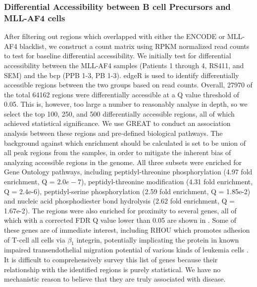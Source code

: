\subsubsection{Differential Accessibility between B cell Precursors and MLL-AF4 cells} \label{ch5:mll_diffacc}

After filtering out regions which overlapped with either the ENCODE or MLL-AF4 blacklist, we construct a count matrix using RPKM normalized read counts to test for baseline differential accessibility. We initially test for differential accessibility between the MLL-AF4 samples (Patients 1 through 4, RS411, and SEM) and the \gls{bcp} (PPB 1-3, PB 1-3). edgeR is used to identify differentially accessible regions between the two groups based on read counts. Overall, 27970 of the total 64162 regions were differentially accessible at a Q value threshold of 0.05. This is, however, too large a number to reasonably analyse in depth, so we select the top 100, 250, and 500 differentially accessible regions, all of which achieved statistical significance. We use GREAT to conduct an association analysis between these regions and pre-defined biological pathways. The background against which enrichment should be calculated is set to be union of all peak regions from the samples, in order to mitigate the inherent bias of analyzing accessible regions in the genome. All three subsets were enriched for Gene Ontology pathways, including peptidyl-threonine phosphorylation (4.97 fold enrichment, Q = $2.0e-7$), peptidyl-threonine modification (4.31 fold enrichment, Q = 2.4e-6), peptidyl-serine phosphorylation (2.59 fold enrichment, Q = 1.85e-2) and nucleic acid phosphodiester bond hydrolysis (2.62 fold enrichment, Q = 1.67e-2). The regions were also enriched for proximity to several genes, all of which with a corrected FDR Q value lower than 0.05 are shown in .  Some of these genes are of immediate interest, including RHOU which promotes adhesion of T-cell \gls{all} cells via $\beta_1$ integrin, potentially implicating the protein in known impaired transendothelial migration potential of various kinds of leukemia cells \cite{Trinidad2009, Infante2013}. It is difficult to comprehensively survey this list of genes because their relationship with the identified regions is purely statistical. We have no mechanistic reason to believe that they are truly associated with disease. 

